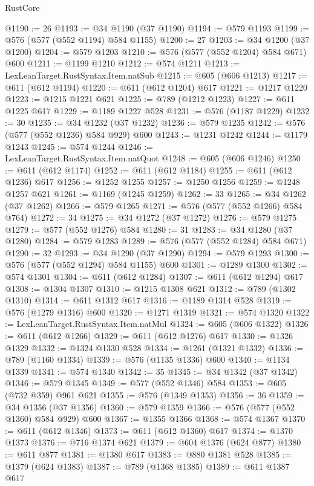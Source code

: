 \begin{lexlean}{RustCore}
\begin{coremodule}
@1190 := 26
@1193 := @34 @1190 (@37 @1190)
@1194 := @579 @1193
@1199 := @576 (@577 (@552 @1194) @584 @1155)
@1200 := 27
@1203 := @34 @1200 (@37 @1200)
@1204 := @579 @1203
@1210 := @576 (@577 (@552 @1204) @584 @671) @600
@1211 := @1199 @1210
@1212 := @574 @1211
@1213 := LexLeanTarget.RustSyntax.Item.natSub
@1215 := @605 (@606 @1213)
@1217 := @611 (@612 @1194)
@1220 := @611 (@612 @1204) @617
@1221 := @1217 @1220
@1223 := @1215 @1221 @621
@1225 := @789 (@1212 @1223)
@1227 := @611 @1225 @617
@1229 := @1189 @1227 @528
@1231 := @576 (@1187 @1229)
@1232 := 30
@1235 := @34 @1232 (@37 @1232)
@1236 := @579 @1235
@1242 := @576 (@577 (@552 @1236) @584 @929) @600
@1243 := @1231 @1242
@1244 := @1179 @1243
@1245 := @574 @1244
@1246 := LexLeanTarget.RustSyntax.Item.natQuot
@1248 := @605 (@606 @1246)
@1250 := @611 (@612 @1174)
@1252 := @611 (@612 @1184)
@1255 := @611 (@612 @1236) @617
@1256 := @1252 @1255
@1257 := @1250 @1256
@1259 := @1248 @1257 @621
@1261 := @1169 (@1245 @1259)
@1262 := 33
@1265 := @34 @1262 (@37 @1262)
@1266 := @579 @1265
@1271 := @576 (@577 (@552 @1266) @584 @764)
@1272 := 34
@1275 := @34 @1272 (@37 @1272)
@1276 := @579 @1275
@1279 := @577 (@552 @1276) @584
@1280 := 31
@1283 := @34 @1280 (@37 @1280)
@1284 := @579 @1283
@1289 := @576 (@577 (@552 @1284) @584 @671)
@1290 := 32
@1293 := @34 @1290 (@37 @1290)
@1294 := @579 @1293
@1300 := @576 (@577 (@552 @1294) @584 @1155) @600
@1301 := @1289 @1300
@1302 := @574 @1301
@1304 := @611 (@612 @1284)
@1307 := @611 (@612 @1294) @617
@1308 := @1304 @1307
@1310 := @1215 @1308 @621
@1312 := @789 (@1302 @1310)
@1314 := @611 @1312 @617
@1316 := @1189 @1314 @528
@1319 := @576 (@1279 @1316) @600
@1320 := @1271 @1319
@1321 := @574 @1320
@1322 := LexLeanTarget.RustSyntax.Item.natMul
@1324 := @605 (@606 @1322)
@1326 := @611 (@612 @1266)
@1329 := @611 (@612 @1276) @617
@1330 := @1326 @1329
@1332 := @1324 @1330 @528
@1334 := @1261 (@1321 @1332)
@1336 := @789 (@1160 @1334)
@1339 := @576 (@1135 @1336) @600
@1340 := @1134 @1339
@1341 := @574 @1340
@1342 := 35
@1345 := @34 @1342 (@37 @1342)
@1346 := @579 @1345
@1349 := @577 (@552 @1346) @584
@1353 := @605 (@732 @359) @961 @621
@1355 := @576 (@1349 @1353)
@1356 := 36
@1359 := @34 @1356 (@37 @1356)
@1360 := @579 @1359
@1366 := @576 (@577 (@552 @1360) @584 @929) @600
@1367 := @1355 @1366
@1368 := @574 @1367
@1370 := @611 (@612 @1346)
@1373 := @611 (@612 @1360) @617
@1374 := @1370 @1373
@1376 := @716 @1374 @621
@1379 := @604 @1376 (@624 @877)
@1380 := @611 @877
@1381 := @1380 @617
@1383 := @880 @1381 @528
@1385 := @1379 (@624 @1383)
@1387 := @789 (@1368 @1385)
@1389 := @611 @1387 @617

\end{coremodule}
\end{lexlean}
